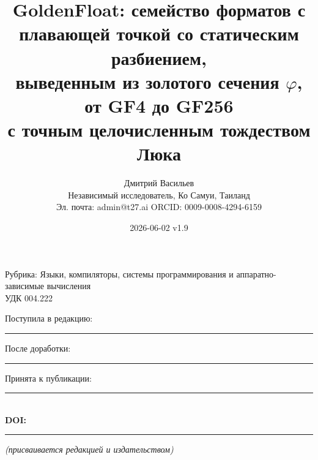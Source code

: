 \documentclass[11pt,a4paper]{article}
\title{GoldenFloat: семейство форматов с плавающей точкой со статическим разбиением,\\
выведенным из золотого сечения \(\varphi\), от GF4 до GF256\\
с точным целочисленным тождеством Люка}
\author{Дмитрий Васильев\\
Независимый исследователь, Ко Самуи, Таиланд\\
Эл. почта: admin@t27.ai \quad ORCID: 0009-0008-4294-6159}
\date{2026-06-02 \quad v1.9}
\theoremstyle{plain}
\begin{document}
\begin{flushleft}\small
Рубрика: Языки, компиляторы, системы программирования и аппаратно-зависимые вычисления\\[2pt]
УДК 004.222
\end{flushleft}

\maketitle

\begin{flushleft}\small
Поступила в редакцию: \rule{2.5cm}{0.4pt}\quad
После доработки: \rule{2.5cm}{0.4pt}\quad
Принята к публикации: \rule{2.5cm}{0.4pt}\\[2pt]
\textbf{DOI:} \rule{4cm}{0.4pt} \emph{(присваивается редакцией и издательством)}
\end{flushleft}
\end{document}
